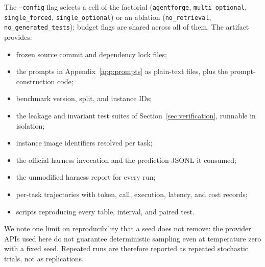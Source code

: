 \documentclass[journal]{IEEEtran}
\begin{document}
The \texttt{--config} flag selects a cell of the factorial (\texttt{agentforge}, \texttt{multi\_optional}, \texttt{single\_forced}, \texttt{single\_optional}) or an ablation (\texttt{no\_retrieval}, \texttt{no\_generated\_tests}); budget flags are shared across all of them. The artifact provides:

\begin{itemize}
    \item frozen source commit and dependency lock files;
    \item the prompts in Appendix~\ref{app:prompts} as plain-text files, plus the prompt-construction code;
    \item benchmark version, split, and instance IDs;
    \item the leakage and invariant test suites of Section~\ref{sec:verification}, runnable in isolation;
    \item instance image identifiers resolved per task;
    \item the official harness invocation and the prediction JSONL it consumed;
    \item the unmodified harness report for every run;
    \item per-task trajectories with token, call, execution, latency, and cost records;
    \item scripts reproducing every table, interval, and paired test.
\end{itemize}

We note one limit on reproducibility that a seed does not remove: the provider APIs used here do not guarantee deterministic sampling even at temperature zero with a fixed seed. Repeated runs are therefore reported as repeated stochastic trials, not as replications.



\end{document}
